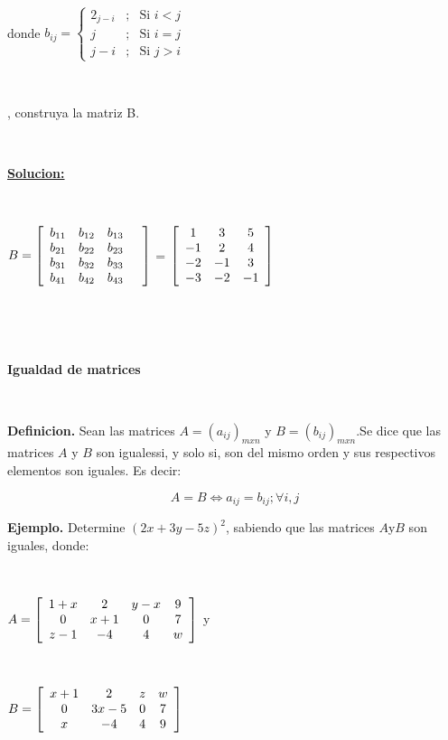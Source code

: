 \documentclass[11pt, conference]{IEEEtran}
\begin{document}
{\begin{enumerate}
\

donde $b_{ij}= \left\{ \begin{array}{lll}
2_{j-i} &;& \mbox{Si $i < j$}\\
j &;& \mbox{Si $i = j$}\\
j-i&;& \mbox{Si $j>i$} \end{array} \right. $ 

\

, construya la matriz B.

\

{\bf \underline{Solucion:}}

\

$ B = \left[\begin{array}{c c c c} b_{11}&b_{12}&b_{13}\\b_{21}&b_{22}&b_{23}\\b_{31}&b_{32}&b_{33}\\b_{41}&b_{42}&b_{43}& \end{array} \right]$ = $ \left[\begin{array}{c c c} 1&3&5\\-1&2&4\\-2&-1&3\\-3&-2&-1 \end{array} \right]$

\

\ 

{\bf  Igualdad de matrices}

\

{\bf Definicion.} Sean las matrices $ A= (a_{ij})_{mxn}$ y $ B=(b_{ij})_{mxn}$.Se dice que las matrices $A$ y $B$ son igualessi, y solo si, son del mismo orden y sus respectivos elementos son iguales. Es decir:

\[ A=B   \Leftrightarrow  a_{ij} = b_{ij};\forall i,j\]

{\bf Ejemplo.} Determine $(2x + 3y - 5z)^2$, sabiendo que las matrices $A$y$B$ son iguales, donde:

\

$ A = \left[\begin{array}{c c c c} 1+x&2&y-x&9\\0&x+1&0&7\\z-1&-4&4&w \end{array} \right]$ y 

\

$B= \left[\begin{array}{c c c c} x+1&2&z&w\\0&3x-5&0&7\\x&-4&4&9 \end{array} \right] $


\end{enumerate}}
\end{document}
